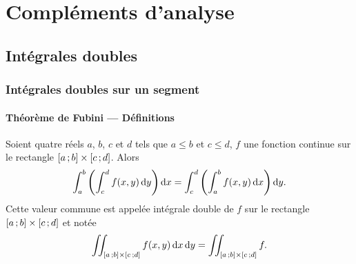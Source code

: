 \chapter{Compléments d'analyse}\label{chap:complementsanalyse}
\minitoc%
\minilof%
\minilot%

\section{Intégrales doubles}

\subsection{Intégrales doubles sur un segment}

\subsubsection{Théorème de Fubini --- Définitions}

\begin{theo}[Admis]
  Soient quatre réels \(a\), \(b\), \(c\) et \(d\) tels que \(a\leqslant b\) et
  \(c \leqslant d\), \(f\) une fonction continue sur le rectangle
  \(\left[ a \, ; {} b \right] \times \left[ c \, ; {} d \right]\). Alors
  \begin{equation}
  \int_a^b\left(\int_c^d f(x,y)\mathop{}\mathopen{}\mathrm{d} y \right)\mathop{}\mathopen{}\mathrm{d} x = \int_c^d\left(\int_a^b
  f(x,y)\mathop{}\mathopen{}\mathrm{d} x\right)\mathop{}\mathopen{}\mathrm{d} y. \end{equation}
  Cette valeur commune est appelée intégrale double de \(f\) sur le rectangle
  \(\left[ a \, ; {} b \right] \times \left[ c \, ; {} d \right]\) et notée
  \begin{equation}
    \iint_{\left[ a \, ; {} b \right] \times \left[ c \, ; {} d \right]}f(x,y) \mathop{}\mathopen{}\mathrm{d} x \mathop{}\mathopen{}\mathrm{d} y
    = \iint_{\left[ a \, ; {} b \right] \times \left[ c \, ; {} d \right]}f.
  \end{equation}
\end{theo}

